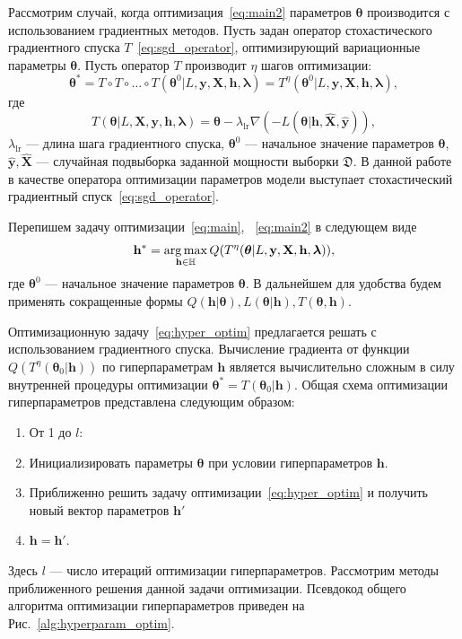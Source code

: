 Рассмотрим случай, когда оптимизация~\eqref{eq:main2} параметров $\boldsymbol{\theta}$ производится с использованием градиентных методов.  Пусть задан оператор стохастического градиентного спуска $T$~\eqref{eq:sgd_operator}, оптимизирующий вариационные параметры $\boldsymbol{\theta}$.
Пусть оператор $T$ производит $\eta$ шагов оптимизации:
\begin{equation}
\label{eq:gd}
	 \boldsymbol{\theta}^{*} = T \circ T \circ \dots \circ T(\boldsymbol{\theta}^{0} | L, \mathbf{y}, \mathbf{X}, \mathbf{h}, \boldsymbol{\lambda}) = T^\eta(\boldsymbol{\theta}^{0} | L, \mathbf{y}, \mathbf{X}, \mathbf{h}, \boldsymbol{\lambda}),
\end{equation}
где 
$$
	T( \boldsymbol{\theta}| L,\mathbf{X},  \mathbf{y},  \mathbf{h}, \boldsymbol{\lambda}) = \boldsymbol{\theta} - \lambda_{\text{lr}} \nabla (-L(\boldsymbol{\theta}|   \mathbf{h},  \hat{\mathbf{X}}, \hat{\mathbf{y}})), 
$$
$ \lambda_{\text{lr}}$ --- длина шага градиентного спуска, $\boldsymbol{\theta}^0$ --- начальное значение параметров $\boldsymbol{\theta}$, $\hat{\mathbf{y}}, \hat{\mathbf{X}}$ --- случайная подвыборка заданной мощности выборки $\mathfrak{D}$. В данной работе в качестве оператора оптимизации параметров модели выступает стохастический градиентный спуск~\eqref{eq:sgd_operator}.

Перепишем задачу оптимизации~\eqref{eq:main}, ~\eqref{eq:main2} в следующем виде
\begin{equation}
\label{eq:hyper_optim}
    \mathbf{h}^{*} = \operatorname*{arg\,max}_{\mathbf{h} \in \mathbb{H}} Q(T^\eta(\boldsymbol{\theta} | L, \mathbf{y}, \mathbf{X}, \mathbf{h}, \boldsymbol{\lambda})),
\end{equation}
где $\boldsymbol{\theta}^0$ --- начальное значение параметров $\boldsymbol{\theta}$.
В дальнейшем для удобства будем применять сокращенные формы $Q(\mathbf{h}| \boldsymbol{\theta}), L(\boldsymbol{\theta}| \mathbf{h}), T(\boldsymbol{\theta}, \mathbf{h}).$

Оптимизационную задачу~\eqref{eq:hyper_optim} предлагается решать с использованием градиентного спуска. Вычисление градиента от функции $Q( T^\eta(\boldsymbol{\theta}_0| \mathbf{h}))$ по гиперпараметрам $\mathbf{h}$ является вычислительно сложным в силу внутренней процедуры оптимизации $\boldsymbol{\theta}^{*} = T(\boldsymbol{\theta}_0| \mathbf{h})$. 
Общая схема  оптимизации гиперпараметров представлена следующим образом:
\begin{enumerate}
\item От 1 до  $l$:
\item Инициализировать параметры $\boldsymbol{\theta}$ при условии гиперпараметров $\mathbf{h}$.
\item Приближенно решить задачу оптимизации~\eqref{eq:hyper_optim} и получить новый вектор параметров $\mathbf{h}'$
\item $\mathbf{h} = \mathbf{h}'$.
\end{enumerate}
Здесь $l$ --- число итераций оптимизации гиперпараметров. Рассмотрим методы приближенного решения данной задачи оптимизации.
Псевдокод общего алгоритма оптимизации гиперпараметров приведен на Рис.~\ref{alg:hyperparam_optim}.



